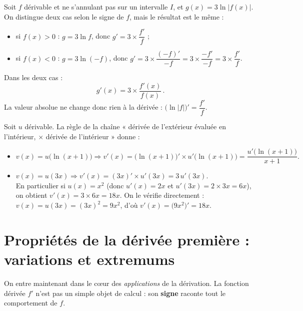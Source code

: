 \documentclass[11pt,a4paper]{article}
\begin{document}
\begin{exemple}[Trois fois le logarithme d'une fonction : $g=3\ln|f|$]
Soit $f$ dérivable et ne s'annulant pas sur un intervalle $I$, et $g(x)=3\ln|f(x)|$. On distingue
deux cas selon le signe de $f$, mais le résultat est le même :
\begin{itemize}[leftmargin=1.6em,topsep=2pt,itemsep=3pt]
  \item si $f(x)>0$ : $g=3\ln f$, donc $g'=3\times\dfrac{f'}{f}$ ;
  \item si $f(x)<0$ : $g=3\ln(-f)$, donc $g'=3\times\dfrac{(-f)'}{-f}=3\times\dfrac{-f'}{-f}=3\times\dfrac{f'}{f}$.
\end{itemize}
Dans les deux cas :
\[
   \boxed{\,g'(x)=3\times\frac{f'(x)}{f(x)}\,}.
\]
La valeur absolue ne change donc rien à la dérivée : $\big(\ln|f|\big)'=\dfrac{f'}{f}$.
\end{exemple}

\begin{exemple}[Composée avec une fonction inconnue : $v(x)=u\big(\ln(x+1)\big)$ et $v(x)=u(3x)$]
Soit $u$ dérivable. La règle de la chaîne « dérivée de l'extérieur évaluée en l'intérieur,
$\times$ dérivée de l'intérieur » donne :
\begin{itemize}[leftmargin=1.6em,topsep=2pt,itemsep=4pt]
  \item $v(x)=u\big(\ln(x+1)\big)\Rightarrow v'(x)=\big(\ln(x+1)\big)'\times u'\big(\ln(x+1)\big)
        =\dfrac{u'\big(\ln(x+1)\big)}{x+1}.$
  \item $v(x)=u(3x)\Rightarrow v'(x)=(3x)'\times u'(3x)=3\,u'(3x).$ \\
        En particulier si $u(x)=x^2$ (donc $u'(x)=2x$ et $u'(3x)=2\times 3x=6x$), on obtient
        $v'(x)=3\times 6x=18x$. On le vérifie directement : $v(x)=u(3x)=(3x)^2=9x^2$, d'où
        $v'(x)=\big(9x^2\big)'=18x$. \checkmark
\end{itemize}
\end{exemple}

\section{Propriétés de la dérivée première : variations et extremums}
\label{sec:der1}
On entre maintenant dans le c\oe ur des \emph{applications} de la dérivation. La fonction dérivée $f'$
n'est pas un simple objet de calcul : son \textbf{signe} raconte tout le comportement de $f$.
\end{document}

